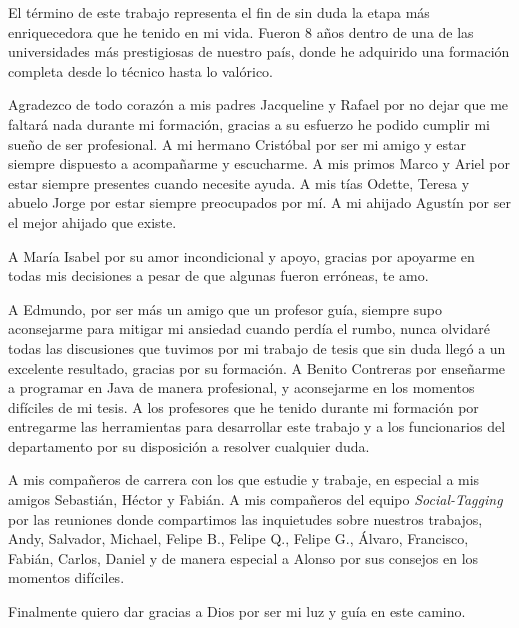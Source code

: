 \begin{gracias}

El término de este trabajo representa el fin de sin duda la etapa más enriquecedora que he tenido en mi vida. Fueron 8 años dentro de una de las universidades más prestigiosas de nuestro país, donde he adquirido una formación completa desde lo técnico hasta lo valórico.

Agradezco de todo corazón a mis padres Jacqueline y Rafael por no dejar que me faltará nada durante mi formación, gracias a su esfuerzo he podido cumplir mi sueño de ser profesional. A mi hermano Cristóbal por ser mi amigo y estar siempre dispuesto a acompañarme y escucharme. A mis primos Marco y Ariel por estar siempre presentes cuando necesite ayuda. A mis tías Odette, Teresa y abuelo Jorge por estar siempre preocupados por mí. A mi ahijado Agustín por ser el mejor ahijado que existe.

A María Isabel por su amor incondicional y apoyo, gracias por apoyarme en todas mis decisiones a pesar de que algunas fueron erróneas, te amo.

A Edmundo, por ser más un amigo que un profesor guía, siempre supo aconsejarme para mitigar mi ansiedad cuando perdía el rumbo, nunca olvidaré todas las discusiones que tuvimos por mi trabajo de tesis que sin duda llegó a un excelente resultado, gracias por su formación. A Benito Contreras por enseñarme a programar en Java de manera profesional, y aconsejarme en los momentos difíciles de mi tesis. A los profesores que he tenido durante mi formación por entregarme las herramientas para desarrollar este trabajo y a los funcionarios del departamento por su disposición a resolver cualquier duda.

A mis compañeros de carrera con los que estudie y trabaje, en especial a mis amigos Sebastián, Héctor y Fabián. A mis compañeros del equipo \textit{Social-Tagging} por las reuniones donde compartimos las inquietudes sobre nuestros trabajos, Andy, Salvador, Michael, Felipe B., Felipe Q., Felipe G., Álvaro, Francisco, Fabián, Carlos, Daniel y de manera especial a Alonso por sus consejos en los momentos difíciles.

Finalmente quiero dar gracias a Dios por ser mi luz y guía en este camino.


\end{gracias}